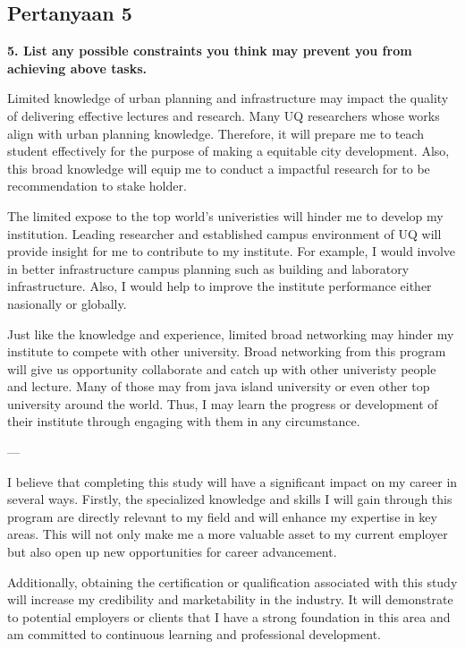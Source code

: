 \documentclass[../main.tex]{subfiles}
\begin{document}
\subsection*{Pertanyaan 5}%
\label{sub:Pertanyaan 5}

\textbf{5. List any possible constraints you think may prevent you from achieving above tasks.}

Limited knowledge of urban planning and infrastructure may impact the quality of delivering effective lectures and research.
Many UQ researchers whose works align with urban planning knowledge.
Therefore, it will prepare me to teach student effectively for the purpose of making a equitable city development.
Also, this broad knowledge will equip me to conduct a impactful research for to be recommendation to stake holder.

The limited expose to the top world's univeristies will hinder me to develop my institution.
Leading researcher and established campus environment of UQ will provide insight for me to contribute to my institute.
For example, I would involve in better infrastructure campus planning such as building and laboratory infrastructure. Also, I would help to improve the institute performance either nasionally or globally.

Just like the knowledge and experience, limited broad networking may hinder my institute to compete with other university.
Broad networking from this program will give us opportunity collaborate and catch up with other univeristy people and lecture.
Many of those may from java island university or even other top university around the world. Thus, I may learn the progress or development of their institute through engaging with them in any circumstance.







---

I believe that completing this study will have a significant impact on my career in several ways. Firstly, the specialized knowledge and skills I will gain through this program are directly relevant to my field and will enhance my expertise in key areas. This will not only make me a more valuable asset to my current employer but also open up new opportunities for career advancement.

Additionally, obtaining the certification or qualification associated with this study will increase my credibility and marketability in the industry. It will demonstrate to potential employers or clients that I have a strong foundation in this area and am committed to continuous learning and professional development.
\end{document}
